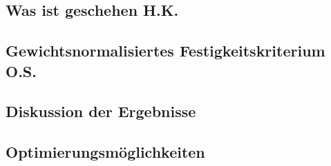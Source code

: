 \subsection{Was ist geschehen H.K.}
\subsection{Gewichtsnormalisiertes Festigkeitskriterium O.S.}
\subsection{Diskussion der Ergebnisse}
\subsection{Optimierungsmöglichkeiten}
